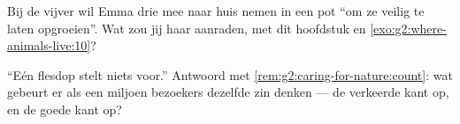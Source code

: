 \begin{exercise}[$\star\star$]\label{exo:g2:caring-for-nature:9}
Bij de vijver wil Emma drie  mee naar huis nemen in een pot
``om ze veilig te laten opgroeien''. Wat zou jij haar aanraden, met dit
hoofdstuk en \cref{exo:g2:where-animals-live:10}?
\end{exercise}

\begin{exercise}[$\star\star$]\label{exo:g2:caring-for-nature:10}
``Eén flesdop stelt niets voor.'' Antwoord met
\cref{rem:g2:caring-for-nature:count}: wat gebeurt er als een miljoen
bezoekers dezelfde zin denken --- de verkeerde kant op, en de goede kant op?
\end{exercise}
